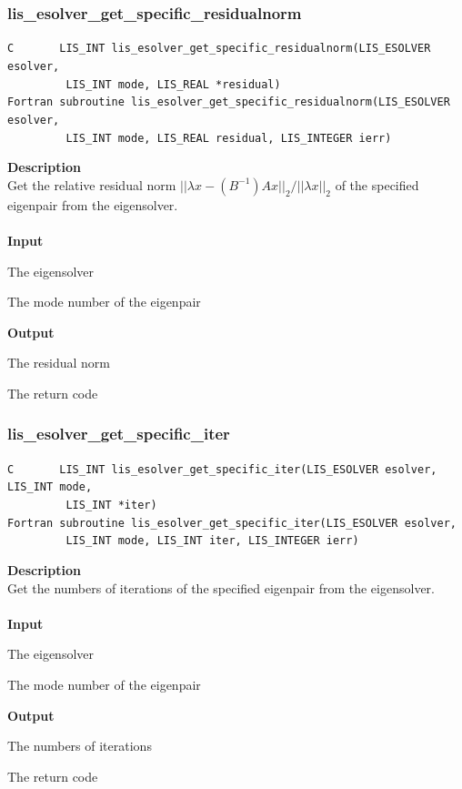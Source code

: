 \documentclass[a4paper]{article}
\newcommand{\namelistlabel}[1]{\mbox{#1}\hfill}
\newenvironment{namelist}[1]{%
\begin{list}{}
  {\let\makelabel\namelistlabel
  \settowidth{\labelwidth}{#1}
  \setlength{\leftmargin}{1.1\labelwidth}}
  }{%
\end{list}}
\begin{document}
\subsubsection{lis\_esolver\_get\_specific\_residualnorm}
\begin{screen}
\verb|C       LIS_INT lis_esolver_get_specific_residualnorm(LIS_ESOLVER esolver,|\\
\verb|         LIS_INT mode, LIS_REAL *residual)|\\
\verb|Fortran subroutine lis_esolver_get_specific_residualnorm(LIS_ESOLVER esolver,|\\
\verb|         LIS_INT mode, LIS_REAL residual, LIS_INTEGER ierr)|
\end{screen}
{\bf Description}\\
\indent
Get the relative residual norm $||\lambda x-(B^{-1})Ax||_2/||\lambda x||_2$ of the specified eigenpair from the eigensolver.
\\ \\
\noindent
{\bf Input}
\begin{namelist}{XXXXXXXXXXXXXXXXXXXX}
\item[\tt esolver] The eigensolver
\item[\tt mode] The mode number of the eigenpair
\end{namelist}
{\bf Output}
\begin{namelist}{XXXXXXXXXXXXXXXXXXXX}
\item[\tt residual]  The residual norm
\item[\tt ierr] The return code
\end{namelist}

\newpage
\subsubsection{lis\_esolver\_get\_specific\_iter}
\begin{screen}
\verb|C       LIS_INT lis_esolver_get_specific_iter(LIS_ESOLVER esolver, LIS_INT mode,|\\
\verb|         LIS_INT *iter)|\\
\verb|Fortran subroutine lis_esolver_get_specific_iter(LIS_ESOLVER esolver, |\\
\verb|         LIS_INT mode, LIS_INT iter, LIS_INTEGER ierr)|
\end{screen}
{\bf Description}\\
\indent
Get the numbers of iterations of the specified eigenpair from the eigensolver.
\\ \\
\noindent
{\bf Input}
\begin{namelist}{XXXXXXXXXXXXXXXXXXXX}
\item[\tt esolver] The eigensolver
\item[\tt mode] The mode number of the eigenpair
\end{namelist}
{\bf Output}
\begin{namelist}{XXXXXXXXXXXXXXXXXXXX}
\item[\tt iter]  The numbers of iterations
\item[\tt ierr] The return code
\end{namelist}
\end{document}
